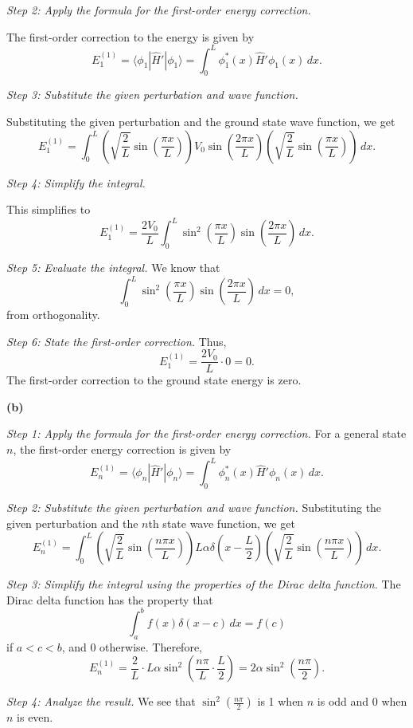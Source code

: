 \documentclass{article}
\begin{document}
\textit{Step 2: Apply the formula for the first-order energy correction.}

The first-order correction to the energy is given by
\[E_1^{(1)} = \langle \phi_1 | \hat{H}' | \phi_1 \rangle = \int_0^L \phi_1^*(x) \hat{H}' \phi_1(x) \, dx.\]

\textit{Step 3: Substitute the given perturbation and wave function.}

Substituting the given perturbation and the ground state wave function, we get
\[E_1^{(1)} = \int_0^L \left(\sqrt{\frac{2}{L}} \sin\left(\frac{\pi x}{L}\right)\right) V_0 \sin\left(\frac{2\pi x}{L}\right) \left(\sqrt{\frac{2}{L}} \sin\left(\frac{\pi x}{L}\right)\right) \, dx.\]

\textit{Step 4: Simplify the integral.}

This simplifies to
\[E_1^{(1)} = \frac{2V_0}{L} \int_0^L \sin^2\left(\frac{\pi x}{L}\right) \sin\left(\frac{2\pi x}{L}\right) \, dx.\]

\textit{Step 5: Evaluate the integral.}
We know that
\[ \int_0^L \sin^2\left(\frac{\pi x}{L}\right) \sin\left(\frac{2\pi x}{L}\right) \, dx = 0, \]
from orthogonality.

\textit{Step 6: State the first-order correction.}
Thus,
\[E_1^{(1)} = \frac{2V_0}{L} \cdot 0 = 0.\]
The first-order correction to the ground state energy is zero.

\textbf{(b)}

\textit{Step 1: Apply the formula for the first-order energy correction.}
For a general state \(n\), the first-order energy correction is given by
\[E_n^{(1)} = \langle \phi_n | \hat{H}' | \phi_n \rangle = \int_0^L \phi_n^*(x) \hat{H}' \phi_n(x) \, dx.\]

\textit{Step 2: Substitute the given perturbation and wave function.}
Substituting the given perturbation and the \(n\)th state wave function, we get
\[E_n^{(1)} = \int_0^L \left(\sqrt{\frac{2}{L}} \sin\left(\frac{n\pi x}{L}\right)\right) L \alpha \delta\left(x - \frac{L}{2}\right) \left(\sqrt{\frac{2}{L}} \sin\left(\frac{n\pi x}{L}\right)\right) \, dx.\]

\textit{Step 3: Simplify the integral using the properties of the Dirac delta function.}
The Dirac delta function has the property that
\[\int_a^b f(x) \delta(x-c) \, dx = f(c)\]
if \(a < c < b\), and 0 otherwise.  Therefore,
\[E_n^{(1)} = \frac{2}{L} \cdot L \alpha \sin^2\left(\frac{n\pi}{L} \cdot \frac{L}{2}\right) = 2\alpha \sin^2\left(\frac{n\pi}{2}\right).\]

\textit{Step 4: Analyze the result.}
We see that \(\sin^2\left(\frac{n\pi}{2}\right)\) is 1 when \(n\) is odd and 0 when \(n\) is even.
\end{document}
